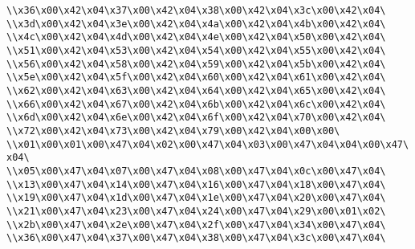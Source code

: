\verb|\\x36\x00\x42\x04\x37\x00\x42\x04\x38\x00\x42\x04\x3c\x00\x42\x04\|\newline
\verb|\\x3d\x00\x42\x04\x3e\x00\x42\x04\x4a\x00\x42\x04\x4b\x00\x42\x04\|\newline
\verb|\\x4c\x00\x42\x04\x4d\x00\x42\x04\x4e\x00\x42\x04\x50\x00\x42\x04\|\newline
\verb|\\x51\x00\x42\x04\x53\x00\x42\x04\x54\x00\x42\x04\x55\x00\x42\x04\|\newline
\verb|\\x56\x00\x42\x04\x58\x00\x42\x04\x59\x00\x42\x04\x5b\x00\x42\x04\|\newline
\verb|\\x5e\x00\x42\x04\x5f\x00\x42\x04\x60\x00\x42\x04\x61\x00\x42\x04\|\newline
\verb|\\x62\x00\x42\x04\x63\x00\x42\x04\x64\x00\x42\x04\x65\x00\x42\x04\|\newline
\verb|\\x66\x00\x42\x04\x67\x00\x42\x04\x6b\x00\x42\x04\x6c\x00\x42\x04\|\newline
\verb|\\x6d\x00\x42\x04\x6e\x00\x42\x04\x6f\x00\x42\x04\x70\x00\x42\x04\|\newline
\verb|\\x72\x00\x42\x04\x73\x00\x42\x04\x79\x00\x42\x04\x00\x00\|\newline
\verb|\\x01\x00\x01\x00\x47\x04\x02\x00\x47\x04\x03\x00\x47\x04\x04\x00\x47\x04\|\newline
\verb|\\x05\x00\x47\x04\x07\x00\x47\x04\x08\x00\x47\x04\x0c\x00\x47\x04\|\newline
\verb|\\x13\x00\x47\x04\x14\x00\x47\x04\x16\x00\x47\x04\x18\x00\x47\x04\|\newline
\verb|\\x19\x00\x47\x04\x1d\x00\x47\x04\x1e\x00\x47\x04\x20\x00\x47\x04\|\newline
\verb|\\x21\x00\x47\x04\x23\x00\x47\x04\x24\x00\x47\x04\x29\x00\x01\x02\|\newline
\verb|\\x2b\x00\x47\x04\x2e\x00\x47\x04\x2f\x00\x47\x04\x34\x00\x47\x04\|\newline
\verb|\\x36\x00\x47\x04\x37\x00\x47\x04\x38\x00\x47\x04\x3c\x00\x47\x04\|\newline
